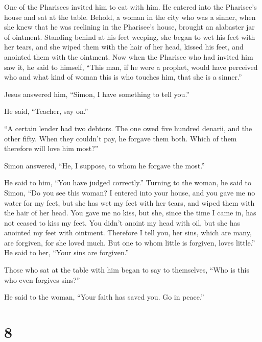  One of the Pharisees invited him to eat with him. He
entered into the Pharisee's house and sat at the table. 
Behold, a woman in the city who was a sinner, when she knew that he was
reclining in the Pharisee's house, brought an alabaster jar of ointment.
 Standing behind at his feet weeping, she began to wet his
feet with her tears, and she wiped them with the hair of her head,
kissed his feet, and anointed them with the ointment.  Now
when the Pharisee who had invited him saw it, he said to himself, ``This
man, if he were a prophet, would have perceived who and what kind of
woman this is who touches him, that she is a sinner.''

 Jesus answered him, ``Simon, I have something to tell
you.''

He said, ``Teacher, say on.''

 ``A certain lender had two debtors. The one owed five
hundred denarii, and the other fifty.  When they couldn't
pay, he forgave them both. Which of them therefore will love him most?''

 Simon answered, ``He, I suppose, to whom he forgave the
most.''

He said to him, ``You have judged correctly.''  Turning to
the woman, he said to Simon, ``Do you see this woman? I entered into
your house, and you gave me no water for my feet, but she has wet my
feet with her tears, and wiped them with the hair of her head.
 You gave me no kiss, but she, since the time I came in,
has not ceased to kiss my feet.  You didn't anoint my head
with oil, but she has anointed my feet with ointment. 
Therefore I tell you, her sins, which are many, are forgiven, for she
loved much. But one to whom little is forgiven, loves little.''
 He said to her, ``Your sins are forgiven.''

 Those who sat at the table with him began to say to
themselves, ``Who is this who even forgives sins?''

 He said to the woman, ``Your faith has saved you. Go in
peace.''

\hypertarget{section-7}{%
\section{8}\label{section-7}}

